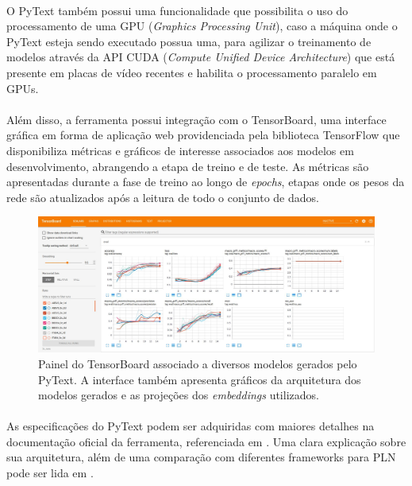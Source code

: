\documentclass[grad,numbers]{coppe}
\begin{document}
		\paragraph{}O PyText também possui uma funcionalidade que possibilita o uso do  processamento de uma GPU (\textit{Graphics Processing Unit}), caso a máquina onde o PyText esteja sendo executado possua uma, para agilizar o treinamento de modelos através da API CUDA (\textit{Compute Unified Device Architecture}) que está presente em placas de vídeo recentes e habilita o processamento paralelo em GPUs.
		\paragraph{}Além disso, a ferramenta possui integração com o TensorBoard, uma interface gráfica em forma de aplicação web providenciada pela biblioteca TensorFlow que disponibiliza métricas e gráficos de interesse associados aos modelos em desenvolvimento, abrangendo a etapa de treino e de teste. As métricas são apresentadas durante a fase de treino ao longo de \textit{epochs}, etapas onde os pesos da rede são atualizados após a leitura de todo o conjunto de dados.
 		\begin{figure}[h]
			{\includegraphics[width=15cm]{tensorboard-panel.jpg}
				\caption{Painel do TensorBoard associado a diversos modelos gerados pelo PyText. A interface também apresenta gráficos da arquitetura dos modelos gerados e as projeções dos \textit{embeddings} utilizados.}
				\label{fig:tensorboard-panel-fig}}
		\end{figure}
  	\paragraph{}As especificações do PyText podem ser adquiridas com maiores detalhes na documentação oficial da ferramenta, referenciada em \cite{pyText-documentation}. Uma clara explicação sobre sua arquitetura, além de uma comparação com diferentes frameworks para PLN pode ser lida em \cite{vinicius-pytext}.
\end{document}

